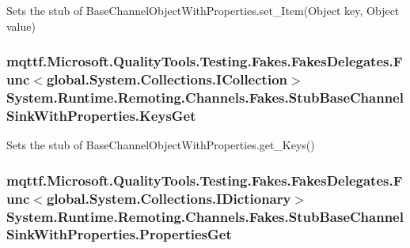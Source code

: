 Sets the stub of Base\-Channel\-Object\-With\-Properties.\-set\-\_\-\-Item(\-Object key, Object value)

\hypertarget{class_system_1_1_runtime_1_1_remoting_1_1_channels_1_1_fakes_1_1_stub_base_channel_sink_with_properties_a01354b8a7308a415b22b860a13e23dd3}{
\subsubsection[{Keys\-Get}]{\setlength{\rightskip}{0pt plus 5cm}mqttf.\-Microsoft.\-Quality\-Tools.\-Testing.\-Fakes.\-Fakes\-Delegates.\-Func$<$global.\-System.\-Collections.\-I\-Collection$>$ System.\-Runtime.\-Remoting.\-Channels.\-Fakes.\-Stub\-Base\-Channel\-Sink\-With\-Properties.\-Keys\-Get}}\label{class_system_1_1_runtime_1_1_remoting_1_1_channels_1_1_fakes_1_1_stub_base_channel_sink_with_properties_a01354b8a7308a415b22b860a13e23dd3}


Sets the stub of Base\-Channel\-Object\-With\-Properties.\-get\-\_\-\-Keys()

\hypertarget{class_system_1_1_runtime_1_1_remoting_1_1_channels_1_1_fakes_1_1_stub_base_channel_sink_with_properties_aadf460e0cfc328080e46d0670f08ddd6}{
\subsubsection[{Properties\-Get}]{\setlength{\rightskip}{0pt plus 5cm}mqttf.\-Microsoft.\-Quality\-Tools.\-Testing.\-Fakes.\-Fakes\-Delegates.\-Func$<$global.\-System.\-Collections.\-I\-Dictionary$>$ System.\-Runtime.\-Remoting.\-Channels.\-Fakes.\-Stub\-Base\-Channel\-Sink\-With\-Properties.\-Properties\-Get}}\label{class_system_1_1_runtime_1_1_remoting_1_1_channels_1_1_fakes_1_1_stub_base_channel_sink_with_properties_aadf460e0cfc328080e46d0670f08ddd6}


